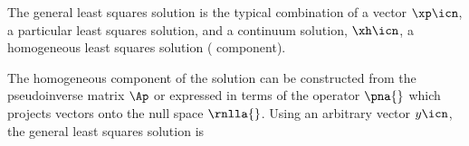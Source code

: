%			




The general least squares solution is the typical combination of a vector $\xp\icn$, a  particular least squares solution, and a continuum solution, $\xh\icn$, a homogeneous least squares solution ( component). 

The homogeneous component of the solution can be constructed from the pseudoinverse matrix $\Ap$ or expressed in terms of the operator $\pna{}$ which projects vectors onto the null space $\rnlla{}$. Using an arbitrary vector $y\icn$, the general least squares solution is
